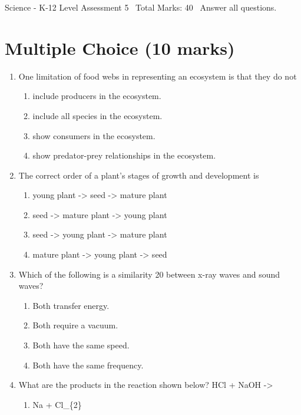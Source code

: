 \documentclass[12pt]{article}
\begin{document}
\begin{center}
Science - K-12 Level Assessment 5 \
Total Marks: 40 \
Answer all questions.
\end{center}

\section*{Multiple Choice (10 marks)}
\begin{enumerate}[label=\arabic*.]
\item One limitation of food webs in representing an ecosystem is that they do not
\begin{enumerate}[label=(\alph*)]
    \item include producers in the ecosystem.
    \item include all species in the ecosystem.
    \item show consumers in the ecosystem.
    \item show predator-prey relationships in the ecosystem.
\end{enumerate}
\item The correct order of a plant's stages of growth and development is
\begin{enumerate}[label=(\alph*)]
    \item young plant -\textgreater{} seed -\textgreater{} mature plant
    \item seed -\textgreater{} mature plant -\textgreater{} young plant
    \item seed -\textgreater{} young plant -\textgreater{} mature plant
    \item mature plant -\textgreater{} young plant -\textgreater{} seed
\end{enumerate}
\item Which of the following is a similarity 20 between x-ray waves and sound waves?
\begin{enumerate}[label=(\alph*)]
    \item Both transfer energy.
    \item Both require a vacuum.
    \item Both have the same speed.
    \item Both have the same frequency.
\end{enumerate}
\item What are the products in the reaction shown below? HCl + NaOH -\textgreater{}
\begin{enumerate}[label=(\alph*)]
    \item Na + Cl\_\{2\}

\end{enumerate}
\end{enumerate}
\end{document}
